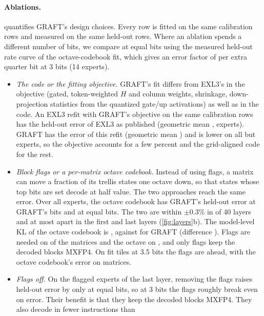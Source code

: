 \paragraph{Ablations.}  quantifies GRAFT's design choices. Every row is fitted on the same
calibration rows and measured on the same held-out rows. Where an ablation spends a different number of bits, we
compare at equal bits using the measured held-out rate curve of the octave-codebook fit, which gives an error factor
of  per extra quarter bit at 3 bits (14 experts).
\begin{itemize}[leftmargin=1.1em,itemsep=1pt,topsep=2pt]
\item \emph{The code or the fitting objective.} GRAFT's fit differs from EXL3's in the objective (gated,
token-weighted $H$ and column weights, shrinkage, down-projection statistics from the quantized gate/up activations)
as well as in the code. An EXL3 refit with GRAFT's objective on the same calibration rows has  the
held-out error of EXL3 as published (geometric mean ,  experts). GRAFT has
 the error of this refit (geometric mean ) and is lower on all but
 experts, so the objective accounts for a few percent and the grid-aligned code for the rest.
\item \emph{Block flags or a per-matrix octave codebook.} Instead of using flags, a matrix can move a fraction of its
trellis states one octave down, so that states whose top bits are set decode at half value. The two approaches reach
the same error. Over all  experts, the octave codebook has  GRAFT's held-out error at GRAFT's
bits and  at equal bits. The two are within $\pm$0.3\% in  of
40 layers and at most  apart in the first and last layers (\cref{fig:layers}b). The model-level KL
of the octave codebook is , against  for GRAFT (difference ). Flags are needed
on  of the matrices and the octave on , and only flags keep the decoded blocks
MXFP4. On fit tiles at 3.5 bits the flags are ahead, with  the octave codebook's error on
 matrices.
\item \emph{Flags off.} On the  flagged experts of the last layer, removing the flags raises
held-out error by only  at equal bits, so at 3 bits the flags roughly break even on error. Their
benefit is that they keep the decoded blocks MXFP4. They also decode in fewer instructions than

\end{itemize}
